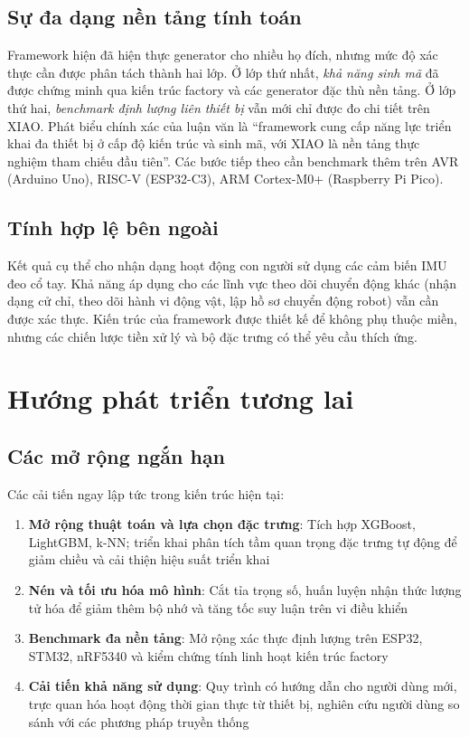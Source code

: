 \subsection{Sự đa dạng nền tảng tính toán}
Framework hiện đã hiện thực generator cho nhiều họ đích, nhưng mức độ xác thực cần được phân tách thành hai lớp. Ở lớp thứ nhất, \textit{khả năng sinh mã} đã được chứng minh qua kiến trúc factory và các generator đặc thù nền tảng. Ở lớp thứ hai, \textit{benchmark định lượng liên thiết bị} vẫn mới chỉ được đo chi tiết trên XIAO. Phát biểu chính xác của luận văn là ``framework cung cấp năng lực triển khai đa thiết bị ở cấp độ kiến trúc và sinh mã, với XIAO là nền tảng thực nghiệm tham chiếu đầu tiên''. Các bước tiếp theo cần benchmark thêm trên AVR (Arduino Uno), RISC-V (ESP32-C3), ARM Cortex-M0+ (Raspberry Pi Pico).

\subsection{Tính hợp lệ bên ngoài}
Kết quả cụ thể cho nhận dạng hoạt động con người sử dụng các cảm biến IMU đeo cổ tay. Khả năng áp dụng cho các lĩnh vực theo dõi chuyển động khác (nhận dạng cử chỉ, theo dõi hành vi động vật, lập hồ sơ chuyển động robot) vẫn cần được xác thực. Kiến trúc của framework được thiết kế để không phụ thuộc miền, nhưng các chiến lược tiền xử lý và bộ đặc trưng có thể yêu cầu thích ứng.

\section{Hướng phát triển tương lai}

\subsection{Các mở rộng ngắn hạn}
Các cải tiến ngay lập tức trong kiến trúc hiện tại:
\begin{enumerate}
    \item \textbf{Mở rộng thuật toán và lựa chọn đặc trưng}: Tích hợp XGBoost, LightGBM, k-NN; triển khai phân tích tầm quan trọng đặc trưng tự động để giảm chiều và cải thiện hiệu suất triển khai
    \item \textbf{Nén và tối ưu hóa mô hình}: Cắt tỉa trọng số, huấn luyện nhận thức lượng tử hóa để giảm thêm bộ nhớ và tăng tốc suy luận trên vi điều khiển
    \item \textbf{Benchmark đa nền tảng}: Mở rộng xác thực định lượng trên ESP32, STM32, nRF5340 và kiểm chứng tính linh hoạt kiến trúc factory
    \item \textbf{Cải tiến khả năng sử dụng}: Quy trình có hướng dẫn cho người dùng mới, trực quan hóa hoạt động thời gian thực từ thiết bị, nghiên cứu người dùng so sánh với các phương pháp truyền thống
\end{enumerate}

